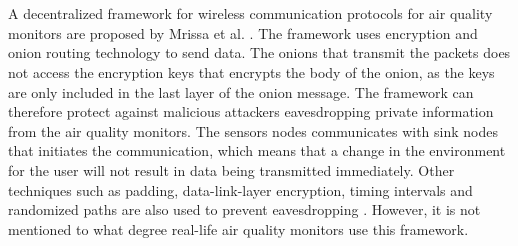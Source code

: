 \\\\
A decentralized framework for wireless communication protocols for air quality monitors are proposed by Mrissa et al. \cite{PrivacyAndFrameworkDecentAQM}. The framework uses encryption and onion routing technology to send data. The onions that transmit the packets does not access the encryption keys that encrypts the body of the onion, as the keys are only included in the last layer of the onion message. The framework can therefore protect against malicious attackers eavesdropping private information from the air quality monitors. The sensors nodes communicates with sink nodes that initiates the communication, which means that a change in the environment for the user will not result in data being transmitted immediately. Other techniques such as padding, data-link-layer encryption, timing intervals and randomized paths are also used to prevent eavesdropping \cite{PrivacyAndFrameworkDecentAQM}. However, it is not mentioned to what degree real-life air quality monitors use this framework. 
\\\\
